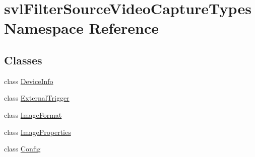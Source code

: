 \hypertarget{namespacesvl_filter_source_video_capture_types}{\section{svl\-Filter\-Source\-Video\-Capture\-Types Namespace Reference}
\label{namespacesvl_filter_source_video_capture_types}
}
\subsection*{Classes}
\begin{DoxyCompactItemize}
\item 
class \hyperlink{classsvl_filter_source_video_capture_types_1_1_device_info}{Device\-Info}
\item 
class \hyperlink{classsvl_filter_source_video_capture_types_1_1_external_trigger}{External\-Trigger}
\item 
class \hyperlink{classsvl_filter_source_video_capture_types_1_1_image_format}{Image\-Format}
\item 
class \hyperlink{classsvl_filter_source_video_capture_types_1_1_image_properties}{Image\-Properties}
\item 
class \hyperlink{classsvl_filter_source_video_capture_types_1_1_config}{Config}
\end{DoxyCompactItemize}
